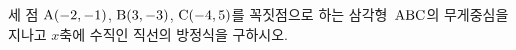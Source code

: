 세 점 $\mathrm{A}(-2{,}\mkern3mu\mathopen{}-1)$, $\mathrm{B}(3{,}\mkern3mu\mathopen{}-3)$, $\mathrm{C}(-4{,}\mkern3mu\mathopen{}5)$를 꼭짓점으로 하는 삼각형~$\mathrm{ABC}$의 무게중심을 지나고 $x$축에 수직인 직선의 방정식을 구하시오.
